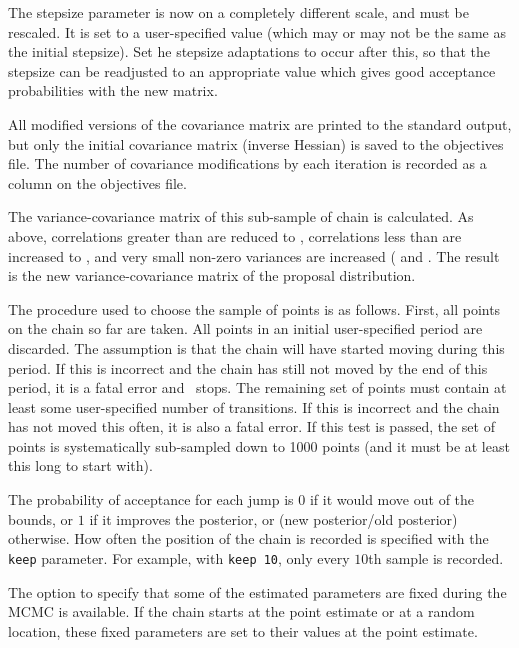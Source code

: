 The stepsize parameter is now on a completely different scale, and must be rescaled. It is set to a user-specified value (which may or may not be the same as the initial stepsize). Set he stepsize adaptations to occur after this, so that the stepsize can be readjusted to an appropriate value which gives good acceptance probabilities with the new matrix.

All modified versions of the covariance matrix are printed to the standard output, but only the initial covariance matrix (inverse Hessian) is saved to the objectives file. The number of covariance modifications by each iteration is recorded as a column on the objectives file.

The variance-covariance matrix of this sub-sample of chain is calculated. As above, correlations greater than  are reduced to , correlations less than  are increased to  , and very small non-zero variances are increased ( and . The result is the new variance-covariance matrix of the proposal distribution.

The procedure used to choose the sample of points is as follows. First, all points on the chain so far are taken. All points in an initial user-specified period are discarded. The assumption is that the chain will have started moving during this period. If this is incorrect and the chain has still not moved by the end of this period, it is a fatal error and \CNAME\ stops. The remaining set of points must contain at least some user-specified number of transitions. If this is incorrect and the chain has not moved this often, it is also a fatal error. If this test is passed, the set of points is systematically sub-sampled down to 1000 points (and it must be at least this long to start with).

The probability of acceptance for each jump is $0$ if it would move out of the bounds, or $1$ if it improves the posterior, or (new posterior/old posterior) otherwise. How often the position of the chain is recorded is specified with the \texttt{keep} parameter. For example, with \texttt{keep 10}, only every $10$th sample is recorded.

The option to specify that some of the estimated parameters are fixed during the MCMC is available. If the chain starts at the point estimate or at a random location, these fixed parameters are set to their values at the point estimate.

